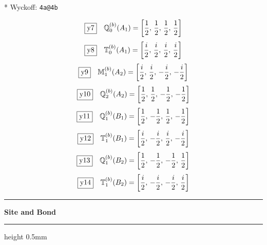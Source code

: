 \documentclass[fleqn,10pt,landscape]{jsarticle}
\begin{document}
\noindent ** Wyckoff: \texttt{4a@4b}

\begin{dmath*}
\fbox{y7}\quad \mathbb{Q}_{0}^{(b)}(A_{1})=\left[ \frac{1}{2},\, \frac{1}{2},\, \frac{1}{2},\, \frac{1}{2} \right]
\end{dmath*}
\begin{dmath*}
\fbox{y8}\quad \mathbb{T}_{0}^{(b)}(A_{1})=\left[ \frac{i}{2},\, \frac{i}{2},\, \frac{i}{2},\, \frac{i}{2} \right]
\end{dmath*}
\begin{dmath*}
\fbox{y9}\quad \mathbb{M}_{1}^{(b)}(A_{2})=\left[ \frac{i}{2},\, \frac{i}{2},\, - \frac{i}{2},\, - \frac{i}{2} \right]
\end{dmath*}
\begin{dmath*}
\fbox{y10}\quad \mathbb{Q}_{2}^{(b)}(A_{2})=\left[ \frac{1}{2},\, \frac{1}{2},\, - \frac{1}{2},\, - \frac{1}{2} \right]
\end{dmath*}
\begin{dmath*}
\fbox{y11}\quad \mathbb{Q}_{1}^{(b)}(B_{1})=\left[ \frac{1}{2},\, - \frac{1}{2},\, \frac{1}{2},\, - \frac{1}{2} \right]
\end{dmath*}
\begin{dmath*}
\fbox{y12}\quad \mathbb{T}_{1}^{(b)}(B_{1})=\left[ \frac{i}{2},\, - \frac{i}{2},\, \frac{i}{2},\, - \frac{i}{2} \right]
\end{dmath*}
\begin{dmath*}
\fbox{y13}\quad \mathbb{Q}_{1}^{(b)}(B_{2})=\left[ \frac{1}{2},\, - \frac{1}{2},\, - \frac{1}{2},\, \frac{1}{2} \right]
\end{dmath*}
\begin{dmath*}
\fbox{y14}\quad \mathbb{T}_{1}^{(b)}(B_{2})=\left[ \frac{i}{2},\, - \frac{i}{2},\, - \frac{i}{2},\, \frac{i}{2} \right]
\end{dmath*}
\vspace{5mm}
\noindent \rule[0.5mm]{5mm}{0.5mm}\hspace{3mm}\textbf{Site and Bond}\hspace{3mm}\leaders\hrule height 0.5mm\hfill\kern0pt
\vspace{3mm}
\end{document}
